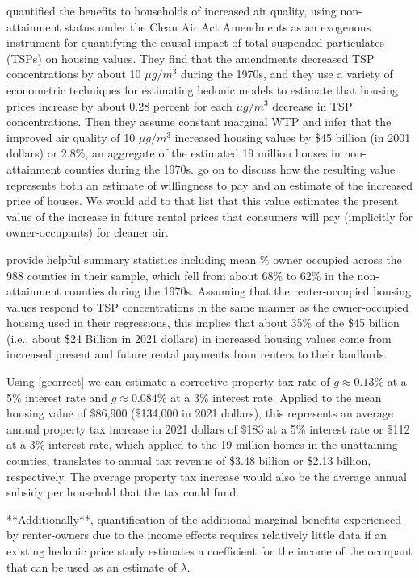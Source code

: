 \documentclass[ecta,nameyear,draft]{econsocart}
\theoremstyle{plain}
\theoremstyle{remark}
\begin{document}
\cite{chaygreenstone05} quantified the benefits to households of increased air quality, using non-attainment status under the Clean Air Act Amendments as an exogenous instrument for quantifying the causal impact of total suspended particulates (TSPs) on housing values. They find that the amendments decreased TSP concentrations by about 10 $\mu g/m^3$ during the 1970s, and they use a variety of econometric techniques for estimating hedonic models to estimate that housing prices increase by about 0.28 percent for each $\mu g/m^3$ decrease in TSP concentrations. Then they assume constant marginal WTP and infer that the improved air quality of 10 $\mu g/m^3$ increased housing values by \$45 billion (in 2001 dollars) or 2.8\%, an aggregate of the estimated 19 million houses in non-attainment counties during the 1970s. \cite{chaygreenstone05} go on to discuss how the resulting value represents both an estimate of willingness to pay and an estimate of the increased price of houses. We would add to that list that this value estimates the present value of the increase in future rental prices that consumers will pay (implicitly for owner-occupants) for cleaner air.

\cite{chaygreenstone05} provide helpful summary statistics including mean \% owner occupied across the 988 counties in their sample, which fell from about 68\% to 62\% in the non-attainment counties during the 1970s. Assuming that the renter-occupied housing values respond to TSP concentrations in the same manner as the owner-occupied housing used in their regressions, this implies that about 35\% of the \$45 billion (i.e., about \$24 Billion in 2021 dollars) in increased housing values come from increased present and future rental payments from renters to their landlords. 

Using \ref{gcorrect} we can estimate a corrective property tax rate of $g\approx 0.13\%$ at a 5\% interest rate and $g\approx 0.084\%$ at a 3\% interest rate. Applied to the mean housing value of \$86,900 (\$134,000 in 2021 dollars), this represents an average annual property tax increase in 2021 dollars of \$183 at a 5\% interest rate or \$112 at a 3\% interest rate, which applied to the 19 million homes in the unattaining counties, translates to annual tax revenue of \$3.48 billion or \$2.13 billion, respectively. The average property tax increase would also be the average annual subsidy per household that the tax could fund.

**Additionally**, quantification of the additional marginal benefits experienced by renter-owners due to the income effects requires relatively little data if an existing hedonic price study estimates a coefficient for the income of the occupant that can be used as an estimate of $\lambda$.
\end{document}
